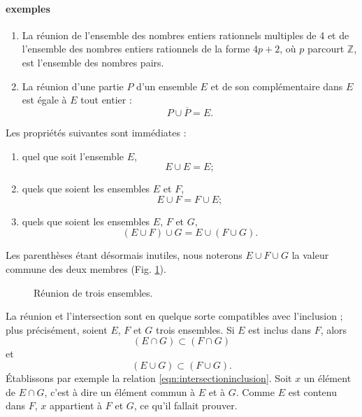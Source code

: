 \documentclass[12pt,parskip=full,chapterprefix=true,a5paper]{scrbook}
\begin{document}
\paragraph{exemples}
\begin{enumerate}
\item La réunion de l'ensemble des nombres entiers rationnels multiples de 4 et de l'ensemble des nombres entiers rationnels de la forme \(4p+2\), où \(p\) parcourt \(\mathbb{Z}\), est l'ensemble des nombres pairs.
\item La réunion d'une partie \(P\) d'un ensemble \(E\) et de son complémentaire dans \(E\) est égale à \(E\) tout entier :
  \[
    P\cup\overline{P}=E.
  \]
\end{enumerate}
Les propriétés suivantes sont immédiates :
\begin{enumerate}[label=\alph*)]
\item quel que soit l'ensemble \(E\),
  \[E\cup E=E;\]
\item quels que soient les ensembles \(E\) et \(F\),
  \[E\cup F=F\cup E;\]
\item quels que soient les ensembles \(E\), \(F\) et \(G\),
  \[(E\cup F)\cup G=E\cup (F\cup G).\]
\end{enumerate}
Les parenthèses étant désormais inutiles, nous noterons \(E\cup F\cup G\) la valeur commune des deux membres (Fig. \ref{fig:reunion3ensembles}).

\begin{figure}[ht]
  \centering
  \caption{\label{fig:reunion3ensembles}Réunion de trois ensembles.}
\end{figure}

La réunion et l'intersection sont en quelque sorte compatibles avec l'inclusion ; plus précisément, soient \(E\), \(F\) et \(G\) trois ensembles. Si \(E\) est inclus dans \(F\), alors
\begin{equation}
  \label{eqn:intersectioninclusion}
  (E\cap G)\subset(F\cap G)
\end{equation}
et
\begin{equation}
  (E\cup G)\subset(F\cup G).
\end{equation}
Établissons par exemple la relation \ref{eqn:intersectioninclusion}. Soit \(x\) un élément de \(E\cap G\), c'est à dire un élément commun à \(E\) et à \(G\). Comme \(E\) est contenu dans \(F\), \(x\) appartient à \(F\) et \(G\), ce qu'il fallait prouver.
\end{document}
